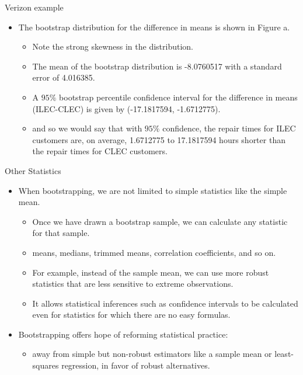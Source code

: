 \documentclass[
  ignorenonframetext,
]{beamer}
\providecommand{\tightlist}{%
  \setlength{\itemsep}{0pt}\setlength{\parskip}{0pt}}
\begin{document}
\begin{frame}{Verizon example}
\label{verizon-example-8}
\begin{itemize}
\item
  The bootstrap distribution for the difference in means is shown in
  Figure a.

  \begin{itemize}
  \tightlist
  \item
    Note the strong skewness in the distribution.
  \item
    The mean of the bootstrap distribution is -8.0760517 with a standard
    error of 4.016385.
  \item
    A \(95\%\) bootstrap percentile confidence interval for the
    difference in means (ILEC-CLEC) is given by (-17.1817594,
    -1.6712775).
  \item
    and so we would say that with \(95\%\) confidence, the repair times
    for ILEC customers are, on average, 1.6712775 to 17.1817594 hours
    shorter than the repair times for CLEC customers.
  \end{itemize}
\end{itemize}
\end{frame}

\begin{frame}{Other Statistics}
\label{other-statistics}
\begin{itemize}
\item
  When bootstrapping, we are not limited to simple statistics like the
  simple mean.

  \begin{itemize}
  \tightlist
  \item
    Once we have drawn a bootstrap sample, we can calculate any
    statistic for that sample.
  \item
    means, medians, trimmed means, correlation coefficients, and so on.
  \item
    For example, instead of the sample mean, we can use more robust
    statistics that are less sensitive to extreme observations.
  \item
    It allows statistical inferences such as confidence intervals to be
    calculated even for statistics for which there are no easy formulas.
  \end{itemize}
\item
  Bootstrapping offers hope of reforming statistical practice:

  \begin{itemize}
  \tightlist
  \item
    away from simple but non-robust estimators like a sample mean or
    least-squares regression, in favor of robust alternatives.
  \end{itemize}
\end{itemize}
\end{frame}
\end{document}
